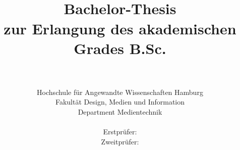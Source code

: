 
\title{\titel\\[2ex]
\LARGE Bachelor-Thesis\\
\large zur Erlangung des akademischen Grades B.Sc.\\[1.5ex]
\LARGE \vorname~\nachname\\[0.5ex] 
\large \matrikelnummer
}

\author{
\large{}\hspace{1ex}
\parbox[b]{11.2cm}{\sffamily\large%
Hochschule für Angewandte Wissenschaften Hamburg\\[-0.2ex]
Fakultät Design, Medien und Information\\[-0.2ex]
Department Medientechnik
}\\[6ex]
\sffamily\large Erstprüfer: \erstpruef\\[0.5ex]
\sffamily\large Zweitprüfer: \zweitpruef}

